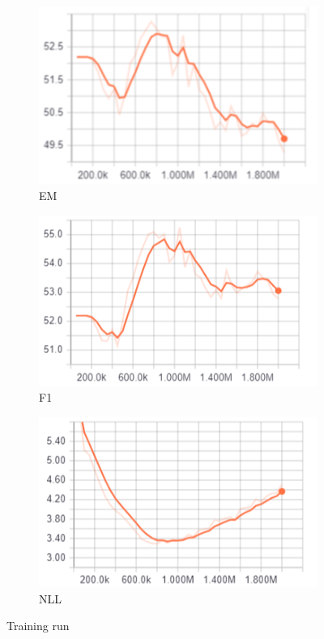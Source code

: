 \documentclass{article}
\begin{document}
\begin{figure}[h!]
  \centering
  \begin{subfigure}[b]{0.3\linewidth}
    \includegraphics[width=\linewidth]{../images/EM.PNG}
     \caption{EM}
  \end{subfigure}
  \begin{subfigure}[b]{0.3\linewidth}
    \includegraphics[width=\linewidth]{../images/F1.PNG}
    \caption{F1}
  \end{subfigure}
  \begin{subfigure}[b]{0.3\linewidth}
    \includegraphics[width=\linewidth]{../images/NLL.PNG}
    \caption{NLL}
  \end{subfigure}  
  \caption{Training run} 
\end{figure} 
\end{document}
